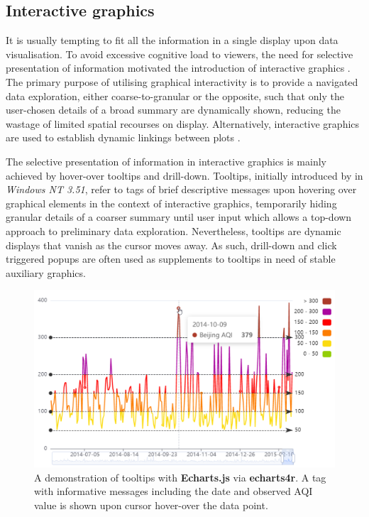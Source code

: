 \documentclass{aucklandthesis}
\begin{document}
\hypertarget{sec:int-graphics}{%
\subsection{Interactive graphics}\label{sec:int-graphics}}

It is usually tempting to fit all the information in a single display upon data visualisation. To avoid excessive cognitive load to viewers, the need for selective presentation of information motivated the introduction of interactive graphics \autocite{intg}. The primary purpose of utilising graphical interactivity is to provide a navigated data exploration, either coarse-to-granular or the opposite, such that only the user-chosen details of a broad summary are dynamically shown, reducing the wastage of limited spatial recourses on display. Alternatively, interactive graphics are used to establish dynamic linkings between plots \autocite{intg}.

The selective presentation of information in interactive graphics is mainly achieved by hover-over tooltips and drill-down. Tooltips, initially introduced by \textcite{tt} in \emph{Windows NT 3.51}, refer to tags of brief descriptive messages upon hovering over graphical elements in the context of interactive graphics, temporarily hiding granular details of a coarser summary until user input which allows a top-down approach to preliminary data exploration. Nevertheless, tooltips are dynamic displays that vanish as the cursor moves away. As such, drill-down \autocite{plotly} and click triggered popups are often used as supplements to tooltips in need of stable auxiliary graphics.

\begin{figure}
\includegraphics[width=1\linewidth]{figures/tt-demo} \caption{A demonstration of tooltips with \textbf{Echarts.js} via \textbf{echarts4r}. A tag with informative messages including the date and observed AQI value is shown upon cursor hover-over the data point.}\label{fig:tt-demo}
\end{figure}
\end{document}
